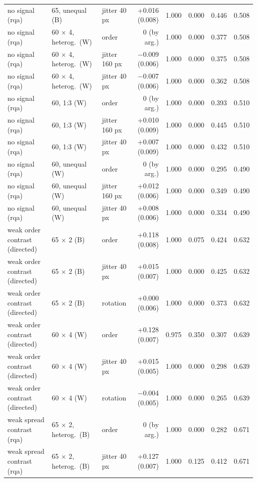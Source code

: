 \begin{longtable}{lllrrrrr}
no signal (rqa) & 65, unequal (B) & jitter 40 px & +0.016 (0.008) & 1.000 & 0.000 & 0.446 & 0.508 \\
no signal (rqa) & 60 $\times$ 4, heterog.\ (W) & order & 0 (by arg.) & 1.000 & 0.000 & 0.377 & 0.508 \\
no signal (rqa) & 60 $\times$ 4, heterog.\ (W) & jitter 160 px & $-$0.009 (0.006) & 1.000 & 0.000 & 0.375 & 0.508 \\
no signal (rqa) & 60 $\times$ 4, heterog.\ (W) & jitter 40 px & $-$0.007 (0.006) & 1.000 & 0.000 & 0.362 & 0.508 \\
no signal (rqa) & 60, 1:3 (W) & order & 0 (by arg.) & 1.000 & 0.000 & 0.393 & 0.510 \\
no signal (rqa) & 60, 1:3 (W) & jitter 160 px & +0.010 (0.009) & 1.000 & 0.000 & 0.445 & 0.510 \\
no signal (rqa) & 60, 1:3 (W) & jitter 40 px & +0.007 (0.009) & 1.000 & 0.000 & 0.432 & 0.510 \\
no signal (rqa) & 60, unequal (W) & order & 0 (by arg.) & 1.000 & 0.000 & 0.295 & 0.490 \\
no signal (rqa) & 60, unequal (W) & jitter 160 px & +0.012 (0.006) & 1.000 & 0.000 & 0.349 & 0.490 \\
no signal (rqa) & 60, unequal (W) & jitter 40 px & +0.008 (0.006) & 1.000 & 0.000 & 0.334 & 0.490 \\
weak order contrast (directed) & 65 $\times$ 2 (B) & order & +0.118 (0.008) & 1.000 & 0.075 & 0.424 & 0.632 \\
weak order contrast (directed) & 65 $\times$ 2 (B) & jitter 40 px & +0.015 (0.007) & 1.000 & 0.000 & 0.425 & 0.632 \\
weak order contrast (directed) & 65 $\times$ 2 (B) & rotation & +0.000 (0.006) & 1.000 & 0.000 & 0.373 & 0.632 \\
weak order contrast (directed) & 60 $\times$ 4 (W) & order & +0.128 (0.007) & 0.975 & 0.350 & 0.307 & 0.639 \\
weak order contrast (directed) & 60 $\times$ 4 (W) & jitter 40 px & +0.015 (0.005) & 1.000 & 0.000 & 0.298 & 0.639 \\
weak order contrast (directed) & 60 $\times$ 4 (W) & rotation & $-$0.004 (0.005) & 1.000 & 0.000 & 0.265 & 0.639 \\
weak spread contrast (rqa) & 65 $\times$ 2, heterog.\ (B) & order & 0 (by arg.) & 1.000 & 0.000 & 0.282 & 0.671 \\
weak spread contrast (rqa) & 65 $\times$ 2, heterog.\ (B) & jitter 40 px & +0.127 (0.007) & 1.000 & 0.125 & 0.412 & 0.671 \\

\end{longtable}
